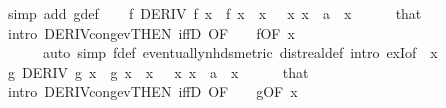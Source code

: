 \begin{isabellebody}
\ {\isacharparenleft}{\kern0pt}simp\ add{\isacharcolon}{\kern0pt}\ g{\isacharunderscore}{\kern0pt}def{\isacharparenright}{\kern0pt}\isanewline
\isanewline
\ \ \isamarkupfalse%
\ f{\isacharcolon}{\kern0pt}\ {\isachardoublequoteopen}DERIV\ f\ x\ {\isacharcolon}{\kern0pt}{\isachargreater}{\kern0pt}\ {\isacharparenleft}{\kern0pt}f{\isacharprime}{\kern0pt}\ x{\isacharparenright}{\kern0pt}{\isachardoublequoteclose}\ \ x{\isacharcolon}{\kern0pt}\ {\isachardoublequoteopen}{}\ {\isacharless}{\kern0pt}\ x{\isachardoublequoteclose}\ {\isachardoublequoteopen}x\ {\isacharless}{\kern0pt}\ a{\isachardoublequoteclose}\ \ x\isanewline
\ \ \ \ \isamarkupfalse%
\ that\isanewline
\ \ \ \ \isamarkupfalse%
\ {\isacharparenleft}{\kern0pt}intro\ DERIV{\isacharunderscore}{\kern0pt}cong{\isacharunderscore}{\kern0pt}ev{\isacharbrackleft}{\kern0pt}THEN\ iffD{}{\isacharcomma}{\kern0pt}\ OF\ {\isacharunderscore}{\kern0pt}\ {\isacharunderscore}{\kern0pt}\ {\isacharunderscore}{\kern0pt}\ f{}{\isacharbrackleft}{\kern0pt}OF\ x{\isacharbrackright}{\kern0pt}{\isacharbrackright}{\kern0pt}{\isacharparenright}{\kern0pt}\isanewline
\ \ \ \ \ \ {\isacharparenleft}{\kern0pt}auto\ simp{\isacharcolon}{\kern0pt}\ f{\isacharunderscore}{\kern0pt}def\ eventually{\isacharunderscore}{\kern0pt}nhds{\isacharunderscore}{\kern0pt}metric\ dist{\isacharunderscore}{\kern0pt}real{\isacharunderscore}{\kern0pt}def\ intro{\isacharbang}{\kern0pt}{\isacharcolon}{\kern0pt}\ exI{\isacharbrackleft}{\kern0pt}of\ {\isacharunderscore}{\kern0pt}\ x{\isacharbrackright}{\kern0pt}{\isacharparenright}{\kern0pt}\isanewline
\isanewline
\ \ \isamarkupfalse%
\ g{\isacharcolon}{\kern0pt}\ {\isachardoublequoteopen}DERIV\ g\ x\ {\isacharcolon}{\kern0pt}{\isachargreater}{\kern0pt}\ {\isacharparenleft}{\kern0pt}g{\isacharprime}{\kern0pt}\ x{\isacharparenright}{\kern0pt}{\isachardoublequoteclose}\ \ x{\isacharcolon}{\kern0pt}\ {\isachardoublequoteopen}{}\ {\isacharless}{\kern0pt}\ x{\isachardoublequoteclose}\ {\isachardoublequoteopen}x\ {\isacharless}{\kern0pt}\ a{\isachardoublequoteclose}\ \ x\isanewline
\ \ \ \ \isamarkupfalse%
\ that\isanewline
\ \ \ \ \isamarkupfalse%
\ {\isacharparenleft}{\kern0pt}intro\ DERIV{\isacharunderscore}{\kern0pt}cong{\isacharunderscore}{\kern0pt}ev{\isacharbrackleft}{\kern0pt}THEN\ iffD{}{\isacharcomma}{\kern0pt}\ OF\ {\isacharunderscore}{\kern0pt}\ {\isacharunderscore}{\kern0pt}\ {\isacharunderscore}{\kern0pt}\ g{}{\isacharbrackleft}{\kern0pt}OF\ x{\isacharbrackright}{\kern0pt}{\isacharbrackright}{\kern0pt}{\isacharparenright}{\kern0pt}\isanewline

\end{isabellebody}
